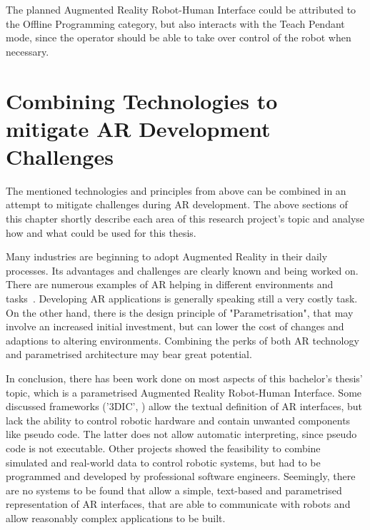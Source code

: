 The planned Augmented Reality Robot-Human Interface could be attributed to the Offline Programming category, but also interacts with the Teach Pendant mode, since the operator should be able to take over control of the robot when necessary.

\section{Combining Technologies to mitigate AR Development Challenges}

The mentioned technologies and principles from above can be combined in an attempt to mitigate challenges during AR development. The above sections of this chapter shortly describe each area of this research project's topic and analyse how and what could be used for this thesis.

Many industries are beginning to adopt Augmented Reality in their daily processes. Its advantages and challenges are clearly known and being worked on. There are numerous examples of AR helping in different environments and tasks~\cite{DiegmannBenefitsAREdu, SalaminBenefitsAR, ARInMilRepair}. Developing AR applications is generally speaking still a very costly task. On the other hand, there is the design principle of "Parametrisation", that may involve an increased initial investment, but can lower the cost of changes and adaptions to altering environments. Combining the perks of both AR technology and parametrised architecture may bear great potential.

In conclusion, there has been work done on most aspects of this bachelor's thesis' topic, which is a parametrised Augmented Reality Robot-Human Interface. Some discussed frameworks ('3DIC', \cite{figueroa2006conceptual}) allow the textual definition of AR interfaces, but lack the ability to control robotic hardware and contain unwanted components like pseudo code. The latter does not allow automatic interpreting, since pseudo code is not executable. Other projects showed the feasibility to combine simulated and real-world data to control robotic systems, but had to be programmed and developed by professional software engineers. Seemingly, there are no systems to be found that allow a simple, text-based and parametrised representation of AR interfaces, that are able to communicate with robots and allow reasonably complex applications to be built.












